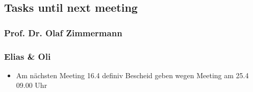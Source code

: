 \hypertarget{tasks-until-next-meeting}{%
\subsection*{Tasks until next meeting}\label{tasks-until-next-meeting}}

\hypertarget{prof-dr-olaf-zimmermann}{%
\subsubsection*{Prof. Dr. Olaf
Zimmermann}\label{prof-dr-olaf-zimmermann}}

\hypertarget{elias--oli}{%
\subsubsection*{Elias \& Oli}\label{elias--oli}}

\begin{itemize}
\item
  Am nächsten Meeting 16.4 definiv Bescheid geben wegen Meeting am 25.4 09.00 Uhr
\end{itemize}